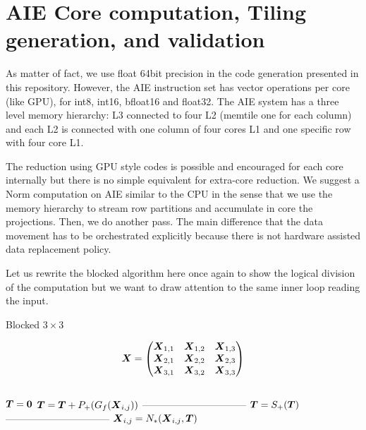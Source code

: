 \documentclass[acmsmall]{acmart}
\begin{document}
\section{AIE Core computation, Tiling generation, and validation}
As matter of fact, we use float 64bit precision in the code generation
presented in this repository. However, the AIE instruction set has
vector operations per core (like GPU), for int8, int16, bfloat16 and
float32. The AIE system has a three level memory hierarchy: L3
connected to four L2 (memtile one for each column) and each L2 is
connected with one column of four cores L1 and one specific row with
four core L1.

The reduction using GPU style codes is possible and encouraged for
each core internally but there is no simple equivalent for extra-core
reduction. We suggest a Norm computation on AIE similar to the CPU in
the sense that we use the memory hierarchy to stream row partitions
and accumulate in core the projections. Then, we do another pass. The
main difference that the data movement has to be orchestrated
explicitly because there is not hardware assisted data replacement
policy.

Let us rewrite the blocked algorithm here once again to show the
logical division of the computation but we want to draw attention to
the same inner loop reading the input.

{\small \begin{algorithm}
    \caption{Blocked $3\times 3$}
    \label{alg:l2_5}
    \begin{algorithmic}
      \STATE \[
        {\boldsymbol X}  =   \begin{pmatrix}
          {\boldsymbol X}_{1,1} &    {\boldsymbol X}_{1,2}&    {\boldsymbol X}_{1,3}  \\
          {\boldsymbol X}_{2,1} &    {\boldsymbol X}_{2,2}&    {\boldsymbol X}_{2,3}  \\
          {\boldsymbol X}_{3,1} &    {\boldsymbol X}_{3,2}&    {\boldsymbol X}_{3,3}  \\
        \end{pmatrix}
      \] \\
          \STATE ${\boldsymbol T} = {\boldsymbol 0} $  
              \STATE ${\boldsymbol T} = {\boldsymbol T} +P_+(G_{f}({\boldsymbol X}_{i,j}))$   
          \ENDWHILE
          \STATE --------------------------------     
          \STATE ${\boldsymbol T}  =   S_+({\boldsymbol T})$       
          \STATE --------------------------------     
             \STATE $ {\boldsymbol X}_{i,j} = N_*({\boldsymbol X}_{i,j},{\boldsymbol T})$  
          \ENDWHILE
      \ENDWHILE
    \end{algorithmic}
\end{algorithm} }
\end{document}
